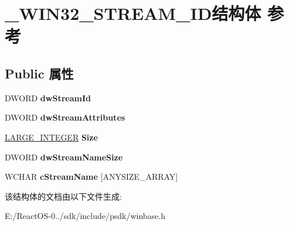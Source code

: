 \hypertarget{struct___w_i_n32___s_t_r_e_a_m___i_d}{}\section{\+\_\+\+W\+I\+N32\+\_\+\+S\+T\+R\+E\+A\+M\+\_\+\+I\+D结构体 参考}
\label{struct___w_i_n32___s_t_r_e_a_m___i_d}
\subsection*{Public 属性}
\begin{DoxyCompactItemize}
\item 
\mbox{\label{struct___w_i_n32___s_t_r_e_a_m___i_d_a396f58ee5de4f3ba76f40cff468c5b06}} 
D\+W\+O\+RD {\bfseries dw\+Stream\+Id}
\item 
\mbox{\label{struct___w_i_n32___s_t_r_e_a_m___i_d_a818406e1fdd7406bd579af8496f8a014}} 
D\+W\+O\+RD {\bfseries dw\+Stream\+Attributes}
\item 
\mbox{\label{struct___w_i_n32___s_t_r_e_a_m___i_d_a5f1fe3070adafcb14cadba7ca5b7e3f4}} 
\hyperlink{union___l_a_r_g_e___i_n_t_e_g_e_r}{L\+A\+R\+G\+E\+\_\+\+I\+N\+T\+E\+G\+ER} {\bfseries Size}
\item 
\mbox{\label{struct___w_i_n32___s_t_r_e_a_m___i_d_a31a2824cfa3185f7faf666844f7039bb}} 
D\+W\+O\+RD {\bfseries dw\+Stream\+Name\+Size}
\item 
\mbox{\label{struct___w_i_n32___s_t_r_e_a_m___i_d_ac59cac3594e766655d4ca7870cf5fdc9}} 
W\+C\+H\+AR {\bfseries c\+Stream\+Name} \mbox{[}A\+N\+Y\+S\+I\+Z\+E\+\_\+\+A\+R\+R\+AY\mbox{]}
\end{DoxyCompactItemize}


该结构体的文档由以下文件生成\+:\begin{DoxyCompactItemize}
\item 
E\+:/\+React\+O\+S-\/0../sdk/include/psdk/winbase.\+h\end{DoxyCompactItemize}
